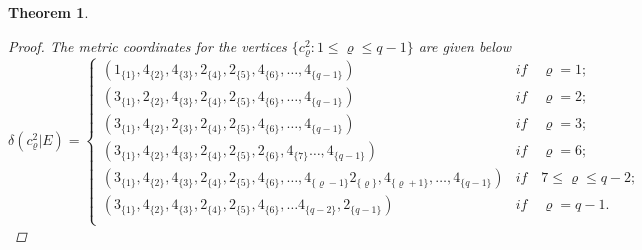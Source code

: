 \documentclass[]{interact}
\theoremstyle{plain}%
\newtheorem{theorem}{Theorem}[section]
\theoremstyle{definition}
\theoremstyle{remark}
\begin{document}
\begin{theorem}
\begin{proof}
                    \noindent The metric coordinates for the vertices 
                     $\{c^2_\varrho: 1\leq \varrho\leq q-1 \}$ are given below
                        \begin{equation*}
                        \delta(c^{2}_{\varrho}|E)=
                   \begin{cases}
                   (1_{\{1\}},4_{\{2\}},4_{\{3\}},2_{\{4\}}, 2_{\{5\}}, 4_{\{6\}}, \ldots,4_{\{q-1\}})&\textit{if}\quad\varrho= 1;\\
                   (3_{\{1\}},2_{\{2\}},4_{\{3\}},2_{\{4\}}, 2_{\{5\}}, 4_{\{6\}}, \ldots,4_{\{q-1\}})&\textit{if}\quad\varrho= 2;\\
                     (3_{\{1\}},4_{\{2\}},2_{\{3\}},2_{\{4\}}, 2_{\{5\}}, 4_{\{6\}}, \ldots,4_{\{q-1\}})&\textit{if}\quad\varrho= 3;\\
                     (3_{\{1\}},4_{\{2\}},4_{\{3\}},2_{\{4\}}, 2_{\{5\}}, 2_{\{6\}}, 4_{\{7\}}  \ldots,4_{\{q-1\}})&\textit{if}\quad\varrho= 6;\\
                     
                   (3_{\{1\}},4_{\{2\}}, 4_{\{3 \}},2_{\{ 4 \}}, 2_{\{ 5 \}}, 4_{\{ 6 \}}, \ldots, 4_{\{\varrho-1 \}}2_{\{\varrho \}}, 4_{\{\varrho+1 \}},\ldots,4_{\{q-1\}})&\textit{if}\quad  7 \leq  \varrho  \leq q-2  ;\\
                     (3_{\{1\}},4_{\{2\}},4_{\{3\}},2_{\{4\}}, 2_{\{5\}}, 4_{\{6\}}, \ldots 4_{\{q-2\}} ,2_{\{q-1\}})&\textit{if}\quad\varrho= q-1.\\
                    \end{cases}
                    \end{equation*}
                    

\end{proof}
\end{theorem}
\end{document}

